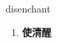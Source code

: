 
\begin{frame}
{\huge disenchant}
\begin{center}
\begin{enumerate}\Large
  \item \textbf{使清醒}
\end{enumerate}
\end{center}
\end{frame}
